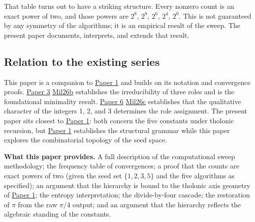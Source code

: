 \documentclass[12pt]{article}
\begin{document}
That table turns out to have a striking structure. Every nonzero count
is an exact power of two, and those powers are \(2^8\), \(2^8\),
\(2^6\), \(2^4\), \(2^0\). This is not guaranteed by any symmetry of the
algorithms; it is an empirical result of the sweep. The present paper
documents, interprets, and extends that result.

\subsection{Relation to the existing series}\label{relation-to-the-existing-series}

This paper is a companion to
\href{https://github.com/baardev/truevalue/blob/main/docnav/Research/papers/1_recursive-tholonic-five-constants/1_recursive-tholonic-five-constants.pdf}{Paper
1} and builds on its notation and convergence proofs.
\href{https://github.com/baardev/truevalue/blob/main/docnav/Research/papers/3_minimal-recursive-triadic-framework/3_minimal-recursive-triadic-framework.pdf}{Paper
3}
\href{https://github.com/baardev/truevalue/blob/main/docnav/Research/papers/3_minimal-recursive-triadic-framework/3_minimal-recursive-triadic-framework.pdf}{Mil26b}
establishes the irreducibility of three roles and is the foundational
minimality result.
\href{https://github.com/baardev/truevalue/blob/main/docnav/Research/papers/6_qualitative-nature-integers-triadic-roles/6_qualitative-nature-integers-triadic-roles.pdf}{Paper
6}
\href{https://github.com/baardev/truevalue/blob/main/docnav/Research/papers/6_qualitative-nature-integers-triadic-roles/6_qualitative-nature-integers-triadic-roles.pdf}{Mil26c}
establishes that the qualitative character of the integers 1, 2, and 3
determines the role assignment. The present paper sits closest to
\href{https://github.com/baardev/truevalue/blob/main/docnav/Research/papers/1_recursive-tholonic-five-constants/1_recursive-tholonic-five-constants.pdf}{Paper
1}: both concern the five constants under tholonic recursion, but
\href{https://github.com/baardev/truevalue/blob/main/docnav/Research/papers/1_recursive-tholonic-five-constants/1_recursive-tholonic-five-constants.pdf}{Paper
1} establishes the structural grammar while this paper explores the
combinatorial topology of the seed space.

\textbf{What this paper provides.} A full description of the
computational sweep methodology; the frequency table of convergences; a
proof that the counts are exact powers of two (given the seed set
\(\{1, 2, 3, 5\}\) and the five algorithms as specified); an argument
that the hierarchy is bound to the tholonic axis geometry of
\href{https://github.com/baardev/truevalue/blob/main/docnav/Research/papers/1_recursive-tholonic-five-constants/1_recursive-tholonic-five-constants.pdf}{Paper
1}; the entropy interpretation; the divide-by-four cascade; the
restoration of \(\pi\) from the raw \(\pi/4\) output; and an argument
that the hierarchy reflects the algebraic standing of the constants.
\end{document}

